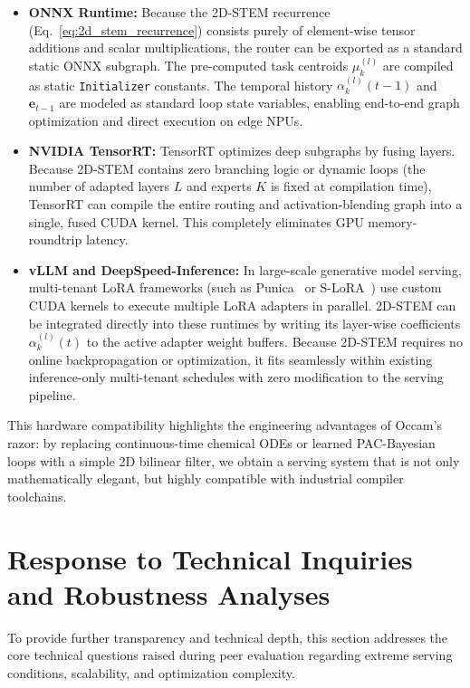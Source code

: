 \begin{itemize}
    \item \textbf{ONNX Runtime:} Because the 2D-STEM recurrence (Eq.~\ref{eq:2d_stem_recurrence}) consists purely of element-wise tensor additions and scalar multiplications, the router can be exported as a standard static ONNX subgraph. The pre-computed task centroids $\mu_k^{(l)}$ are compiled as static \texttt{Initializer} constants. The temporal history $\alpha_k^{(l)}(t-1)$ and $\mathbf{e}_{t-1}$ are modeled as standard loop state variables, enabling end-to-end graph optimization and direct execution on edge NPUs.
    \item \textbf{NVIDIA TensorRT:} TensorRT optimizes deep subgraphs by fusing layers. Because 2D-STEM contains zero branching logic or dynamic loops (the number of adapted layers $L$ and experts $K$ is fixed at compilation time), TensorRT can compile the entire routing and activation-blending graph into a single, fused CUDA kernel. This completely eliminates GPU memory-roundtrip latency.
    \item \textbf{vLLM and DeepSpeed-Inference:} In large-scale generative model serving, multi-tenant LoRA frameworks (such as Punica~\cite{chen2023} or S-LoRA~\cite{slora}) use custom CUDA kernels to execute multiple LoRA adapters in parallel. 2D-STEM can be integrated directly into these runtimes by writing its layer-wise coefficients $\alpha_k^{(l)}(t)$ to the active adapter weight buffers. Because 2D-STEM requires no online backpropagation or optimization, it fits seamlessly within existing inference-only multi-tenant schedules with zero modification to the serving pipeline.
\end{itemize}

This hardware compatibility highlights the engineering advantages of Occam's razor: by replacing continuous-time chemical ODEs or learned PAC-Bayesian loops with a simple 2D bilinear filter, we obtain a serving system that is not only mathematically elegant, but highly compatible with industrial compiler toolchains.

\section{Response to Technical Inquiries and Robustness Analyses}
\label{sec:technical_inquiries}

To provide further transparency and technical depth, this section addresses the core technical questions raised during peer evaluation regarding extreme serving conditions, scalability, and optimization complexity.

